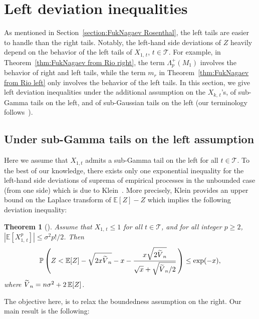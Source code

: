 \documentclass[10pt]{amsart}
\newtheorem{theo}{Theorem}[section]
\theoremstyle{definition}\newtheorem{defi}[theo]{Definition}\newtheorem{rema}[theo]{Remark}\newtheorem{exam}[theo]{Example}\newtheorem{exem}[theo]{Example}\newtheorem{nota}[theo]{Notation}
\newcommand{\bE}{\mathbb{E}}
\newcommand{\bP}{\mathbb{P}}
\newcommand{\cT}{\mathcal{T}}
\newcommand*{\MK}{\mkern 2mu}
\let\oldtilde\tilde
\renewcommand*{\tilde}[1]{\mathchoice{\widetilde{#1}}{\widetilde{#1}}{\oldtilde{#1}}{\oldtilde{#1}}}
\begin{document}
\section{Left deviation inequalities}\label{section:left deviation inequalities}
As mentioned in Section~\ref{section:FukNagaev Rosenthal}, the left tails are easier to handle than the right tails. Notably, the left-hand side deviations of $Z$ heavily depend on the behavior of the left tails of $X_{1,\,t}$, $t\in\cT$. For example, in Theorem~\ref{thm:FukNagaev from Rio right}, the term $\Lambda_p^+(M_1)$ involves the behavior of right and left tails, while the term $m_r$ in Theorem~\ref{thm:FukNagaev from Rio left} only involves the behavior of the left tails. In this section, we give left deviation inequalities under the additional assumption on the $X_{k,\,t}$'s, of sub-Gamma tails on the left, and of sub-Gaussian tails on the left (our terminology follows~\cite{BLM13}).

\subsection{Under sub-Gamma tails on the left assumption}\label{subsection:sub-Gamma}
Here we assume that $X_{1,t}$ admits a sub-Gamma tail on the left for all $t\in\cT$. To the best of our knowledge, there exists only one exponential inequality for the left-hand side deviations of suprema of empirical processes in the unbounded case (from one side) which is due to Klein~\cite{Klein02}. More precisely, Klein provides an upper bound on the Laplace transform of $\bE[Z]-Z$ which implies the following deviation inequality:
\begin{theo}[{\cite[Theorem~1.1$\MK$(3)]{Klein02}}]
Assume that $X_{1,\,t}\leq 1$ for all $t\in\cT$, and for all integer $p\geq 2$, $|\bE[X_{1,\,t}^p]|\leq \sigma^2 p!/2$. Then
\begin{equation*}
\bP\left(Z< \bE[Z] -\sqrt{2x\tilde V_n}-x-\frac{x\sqrt{2\tilde V_n}}{\sqrt{x}+\sqrt{\tilde V_n/2}}\,\right)\leq \exp(-x),
\end{equation*}
where $\tilde V_n=n\sigma^2+2\,\bE[Z]$.
\end{theo}

The objective here, is to relax the boundedness assumption on the right. Our main result is the following:
\end{document}
